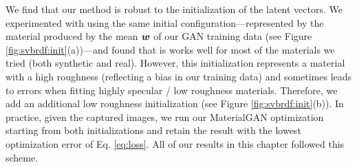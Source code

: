We find that our method is robust to the initialization of the latent vectors. We experimented with using the same initial configuration---represented by the material produced by the mean $\bm{w}$ of our GAN training data (see Figure \ref{fig:svbrdf:init}(a))---and found that is works well for most of the materials we tried (both synthetic and real).
However, this initialization represents a material with a high roughness (reflecting a bias in our training data) and sometimes leads to errors when fitting highly specular / low roughness materials.
Therefore, we add an additional low roughness initialization (see Figure \ref{fig:svbrdf:init}(b)).
In practice, given the captured images, we run our MaterialGAN optimization starting from both initializations and retain the result with the lowest optimization error of Eq. \eqref{eq:loss}.
All of our results in this chapter followed this scheme.

